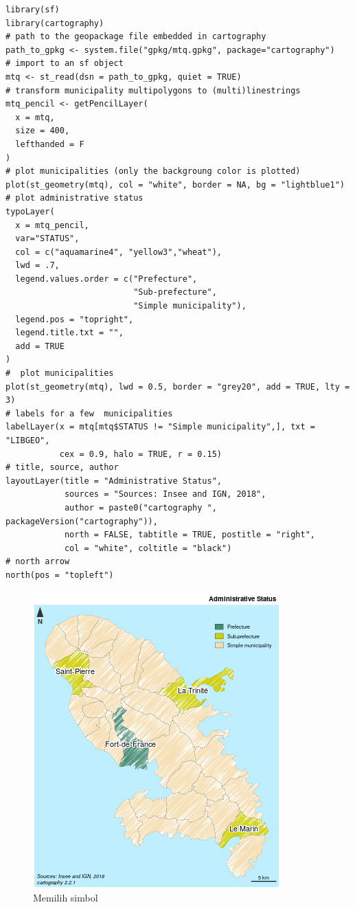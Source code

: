 \documentclass[]{book}
\begin{document}
\begin{verbatim}
library(sf)
library(cartography)
# path to the geopackage file embedded in cartography
path_to_gpkg <- system.file("gpkg/mtq.gpkg", package="cartography")
# import to an sf object
mtq <- st_read(dsn = path_to_gpkg, quiet = TRUE)
# transform municipality multipolygons to (multi)linestrings
mtq_pencil <- getPencilLayer(
  x = mtq, 
  size = 400, 
  lefthanded = F
)
# plot municipalities (only the backgroung color is plotted)
plot(st_geometry(mtq), col = "white", border = NA, bg = "lightblue1")
# plot administrative status
typoLayer(
  x = mtq_pencil, 
  var="STATUS",  
  col = c("aquamarine4", "yellow3","wheat"), 
  lwd = .7,
  legend.values.order = c("Prefecture",
                          "Sub-prefecture", 
                          "Simple municipality"),
  legend.pos = "topright",
  legend.title.txt = "", 
  add = TRUE
)
#  plot municipalities
plot(st_geometry(mtq), lwd = 0.5, border = "grey20", add = TRUE, lty = 3)
# labels for a few  municipalities
labelLayer(x = mtq[mtq$STATUS != "Simple municipality",], txt = "LIBGEO", 
           cex = 0.9, halo = TRUE, r = 0.15)
# title, source, author
layoutLayer(title = "Administrative Status",
            sources = "Sources: Insee and IGN, 2018", 
            author = paste0("cartography ", packageVersion("cartography")), 
            north = FALSE, tabtitle = TRUE, postitle = "right", 
            col = "white", coltitle = "black") 
# north arrow
north(pos = "topleft")
\end{verbatim}

\begin{figure}

{\centering \includegraphics[width=0.8\linewidth]{images/09/carto3} 

}

\caption{Memilih simbol}\label{fig:carto3}
\end{figure}


\end{document}
